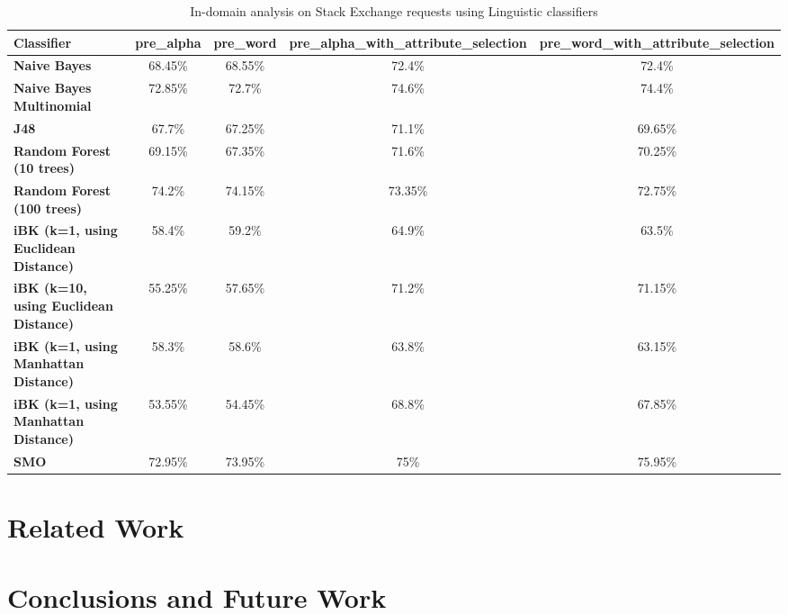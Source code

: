 \documentclass[conference]{IEEEtran}
\begin{document}
\begin{table*}[htbp]
\caption{In-domain analysis on Stack Exchange requests using Linguistic classifiers }
\centering
\vspace{5pt}
\begin{tabular}{|l|c|c|c|c|}
\hline
\textbf{Classifier} & \textbf{pre\_alpha} & \textbf{pre\_word} & \textbf{pre\_alpha\_with\_attribute\_selection} & \textbf{pre\_word\_with\_attribute\_selection} \\
\hline\hline
\textbf{Naive Bayes} & 68.45\% & 68.55\% & 72.4\% & 72.4\% \\ 
\hline
\textbf{Naive Bayes Multinomial} & 72.85\% & 72.7\% & 74.6\% & 74.4\% \\ 
\hline
\textbf{J48} & 67.7\% & 67.25\% & 71.1\% & 69.65\% \\ 
\hline
\textbf{Random Forest (10 trees)} & 69.15\% & 67.35\% & 71.6\% & 70.25\% \\ 
\hline
\textbf{Random Forest (100 trees)} & 74.2\% & 74.15\% & 73.35\% & 72.75\% \\ 
\hline
\textbf{iBK (k=1, using Euclidean Distance)} & 58.4\% & 59.2\% & 64.9\% & 63.5\% \\ 
\hline
\textbf{iBK (k=10, using Euclidean Distance)} & 55.25\% & 57.65\% & 71.2\% & 71.15\% \\ 
\hline
\textbf{iBK (k=1, using Manhattan Distance)} & 58.3\% & 58.6\% & 63.8\% & 63.15\% \\ 
\hline
\textbf{iBK (k=1, using Manhattan Distance)} & 53.55\% & 54.45\% & 68.8\% & 67.85\% \\ 
\hline
\textbf{SMO} & 72.95\% & 73.95\% & 75\% & 75.95\% \\ 
\hline
\hline
\end{tabular}
\label{table:in-domain-stack-Ling}
\end{table*}

\section{Related Work}

\section{Conclusions and Future Work}
\end{document}
